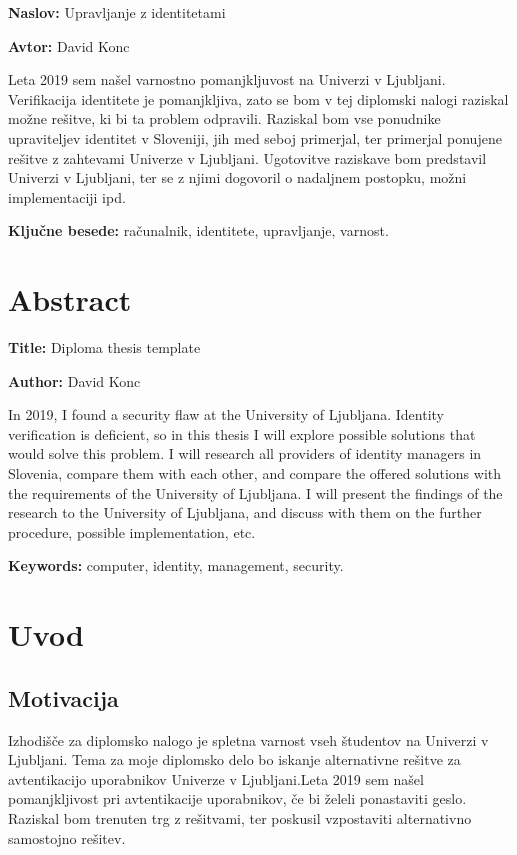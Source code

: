 \documentclass[a4paper,12pt,openright]{book}
\newcommand{\ttitle}{Upravljanje z identitetami}
\newcommand{\ttitleEn}{Diploma thesis template}
\newcommand{\tauthor}{David Konc}
\newcommand{\tkeywords}{računalnik, identitete, upravljanje, varnost}
\newcommand{\tkeywordsEn}{computer, identity, management, security}
\newcommand{\clearemptydoublepage}{\newpage{\pagestyle{empty}\cleardoublepage}}
\begin{document}
{\noindent\textbf{Naslov:} \ttitle
\bigskip

\noindent\textbf{Avtor:} \tauthor
\bigskip

\noindent Leta 2019 sem našel varnostno pomanjkljuvost na Univerzi v Ljubljani. Verifikacija identitete je pomanjkljiva, zato se bom v tej diplomski nalogi raziskal možne rešitve, ki bi ta problem odpravili. Raziskal bom vse ponudnike upraviteljev identitet v Sloveniji, jih med seboj primerjal, ter primerjal ponujene rešitve z zahtevami Univerze v Ljubljani. Ugotovitve raziskave bom predstavil Univerzi v Ljubljani, ter se z njimi dogovoril o nadaljnem postopku, možni implementaciji ipd. 
\bigskip

\noindent\textbf{Ključne besede:} \tkeywords.
\clearemptydoublepage

\chapter*{Abstract}

\noindent\textbf{Title:} \ttitleEn
\bigskip

\noindent\textbf{Author:} \tauthor
\bigskip

\noindent In 2019, I found a security flaw at the University of Ljubljana. Identity verification is deficient, so in this thesis I will explore possible solutions that would solve this problem. I will research all providers of identity managers in Slovenia, compare them with each other, and compare the offered solutions with the requirements of the University of Ljubljana. I will present the findings of the research to the University of Ljubljana, and discuss with them on the further procedure, possible implementation, etc.


\bigskip

\noindent\textbf{Keywords:} \tkeywordsEn.
\clearemptydoublepage

\mainmatter
\setcounter{page}{1}
\pagestyle{fancy}

\chapter{Uvod}

\section{Motivacija}
Izhodišče za diplomsko nalogo je spletna varnost vseh študentov na Univerzi v Ljubljani. Tema za moje diplomsko delo bo iskanje alternativne rešitve za avtentikacijo uporabnikov Univerze v Ljubljani.Leta 2019 sem našel pomanjkljivost pri avtentikacije uporabnikov, če bi želeli ponastaviti geslo. Raziskal bom trenuten trg z rešitvami, ter poskusil vzpostaviti alternativno samostojno rešitev. \newline

}
\end{document}
